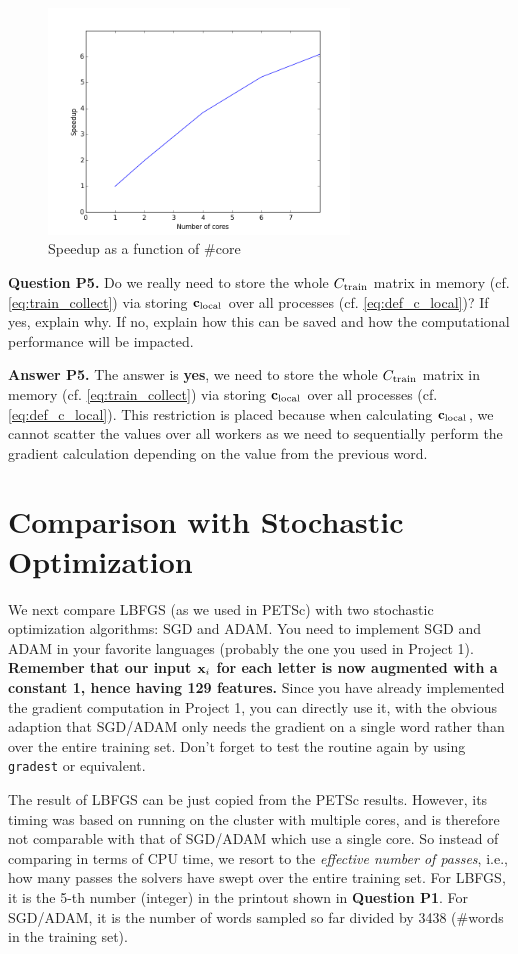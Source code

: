 \documentclass[11pt]{report}
\begin{document}
\begin{figure}
\centering
\includegraphics[width=8cm]{q4}
\caption{Speedup as a function of \#core}
\label{fig:scalability}
\end{figure}

{\bf Question P5.}
Do we really need to store the whole ${C_{\text{train}}}$ matrix in memory (cf. \eqref{eq:train_collect}) via storing $\mathbf{\boldsymbol{c}}_{\text{local}}$ over all processes (cf. \eqref{eq:def_c_local})?
If yes, explain why.
If no, explain how this can be saved and how the computational performance will be impacted.

{\bf Answer P5.} The answer is \textbf{yes}, we need to store the whole ${C_{\text{train}}}$ matrix in memory (cf. \eqref{eq:train_collect}) via storing $\mathbf{\boldsymbol{c}}_{\text{local}}$ over all processes (cf. \eqref{eq:def_c_local}). This restriction is placed because when calculating $\mathbf{\boldsymbol{c}}_{\text{local}}$, we cannot scatter the values over all workers as we need to sequentially perform the gradient calculation depending on the value from the previous word.

\section{Comparison with Stochastic Optimization}

We next compare LBFGS (as we used in PETSc) with two stochastic optimization algorithms: SGD and ADAM.
You need to implement SGD and ADAM in your favorite languages (probably the one you used in Project 1).
{\bf Remember that our input $\mathbf{\boldsymbol{x}}_i$ for each letter is now augmented with a constant 1, hence having 129 features.}
Since you have already implemented the gradient computation in Project 1, 
you can directly use it,
with the obvious adaption that SGD/ADAM only needs the gradient on a single word rather than over the entire training set.
Don't forget to test the routine again by using \verb#gradest# or equivalent.


The result of LBFGS can be just copied from the PETSc results.
However, its timing was based on running on the cluster with multiple cores,
and is therefore not comparable with that of SGD/ADAM which use a single core.
So instead of comparing in terms of CPU time, 
we resort to the \emph{effective number of passes}, 
i.e., how many passes the solvers have swept over the entire training set.
For LBFGS, it is the 5-th number (integer) in the printout shown in {\bf Question P1}.
For SGD/ADAM, it is the number of words sampled so far divided by 3438
(\#words in the training set).
\end{document}
